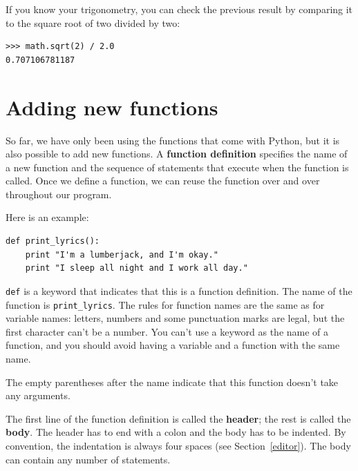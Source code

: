 \documentclass[10pt]{book}
\begin{document}

If you know
your trigonometry, you can check the previous result by comparing it to
the square root of two divided by two:


\beforeverb
\begin{verbatim}
>>> math.sqrt(2) / 2.0
0.707106781187
\end{verbatim}
\afterverb
%

\section{Adding new functions}

So far, we have only been using the functions that come with Python,
but it is also possible to add new functions.
A {\bf function definition} specifies the name of a new function and
the sequence of statements that execute when the function is called.
Once we define a function, we can reuse the function over and over 
throughout our program.


Here is an example:

\beforeverb
\begin{verbatim}
def print_lyrics():
    print "I'm a lumberjack, and I'm okay."
    print "I sleep all night and I work all day."
\end{verbatim}
\afterverb
%
{\tt def} is a keyword that indicates that this is a function
definition.  The name of the function is \verb"print_lyrics".  The
rules for function names are the same as for variable names: letters,
numbers and some punctuation marks are legal, but the first character
can't be a number.  You can't use a keyword as the name of a function,
and you should avoid having a variable and a function with the same
name.


The empty parentheses after the name indicate that this function
doesn't take any arguments.


The first line of the function definition is called the {\bf header};
the rest is called the {\bf body}.  The header has to end with a colon
and the body has to be indented.  By convention, the indentation is
always four spaces (see Section~\ref{editor}).  The body can contain
any number of statements.
\end{document}
